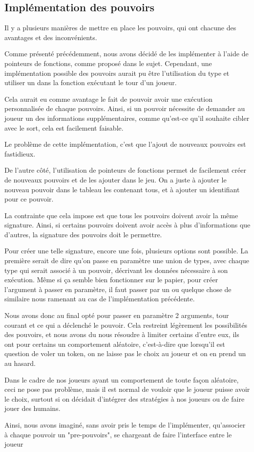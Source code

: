 
\subsection{Implémentation des pouvoirs}

Il y a plusieurs manières de mettre en place les pouvoirs, qui ont chacune des avantages et des inconvénients.

Comme présenté précédemment, nous avons décidé de les implémenter à l'aide de pointeurs de fonctions, comme proposé dans le sujet. Cependant, une implémentation possible des pouvoirs aurait pu être l'utilisation du type  et utiliser un  dans la fonction exécutant le tour d'un joueur.

Cela aurait eu comme avantage le fait de pouvoir avoir une exécution personnalisée de chaque pouvoirs. Ainsi, si un pouvoir nécessite de demander au joueur un des informations supplémentaires, comme qu'est-ce qu'il souhaite cibler avec le sort, cela est facilement faisable.

Le problème de cette implémentation, c'est que l'ajout de nouveaux pouvoirs est fastidieux.

De l'autre côté, l'utilisation de pointeurs de fonctions permet de facilement créer de nouveaux pouvoirs et de les ajouter dans le jeu. On a juste à ajouter le nouveau pouvoir dans le tableau les contenant tous, et à ajouter un identifiant pour ce pouvoir.

La contrainte que cela impose est que tous les pouvoirs doivent avoir la même signature. Ainsi, si certains pouvoirs doivent avoir accès à plus d'informations que d'autres, la signature des pouvoirs doit le permettre.

Pour créer une telle signature, encore une fois, plusieurs options sont possible. La première serait de dire qu'on passe en paramètre une union de types, avec chaque type qui serait associé à un pouvoir, décrivant les données nécessaire à son exécution. Même si ça semble bien fonctionner sur le papier, pour créer l'argument à passer en paramètre, il faut passer par un  ou quelque chose de similaire nous ramenant au cas de l'implémentation précédente.

Nous avons donc au final opté pour passer en paramètre 2 arguments, tour courant et ce qui a déclenché le pouvoir. Cela restreint légèrement les possibilités des pouvoirs, et nous avons du nous résoudre à limiter certains d'entre eux, ils ont pour certains un comportement aléatoire, c'est-à-dire que lorsqu'il est question de voler un token, on ne laisse pas le choix au joueur et on en prend un au hasard.

Dans le cadre de nos joueurs ayant un comportement de toute façon aléatoire, ceci ne pose pas problème, mais il est normal de vouloir que le joueur puisse avoir le choix, surtout si on décidait d'intégrer des stratégies à nos joueurs ou de faire jouer des humains.

Ainsi, nous avons imaginé, sans avoir pris le temps de l'implémenter, qu'associer à chaque pouvoir un "pre-pouvoirs", se chargeant de faire l'interface entre le joueur 





